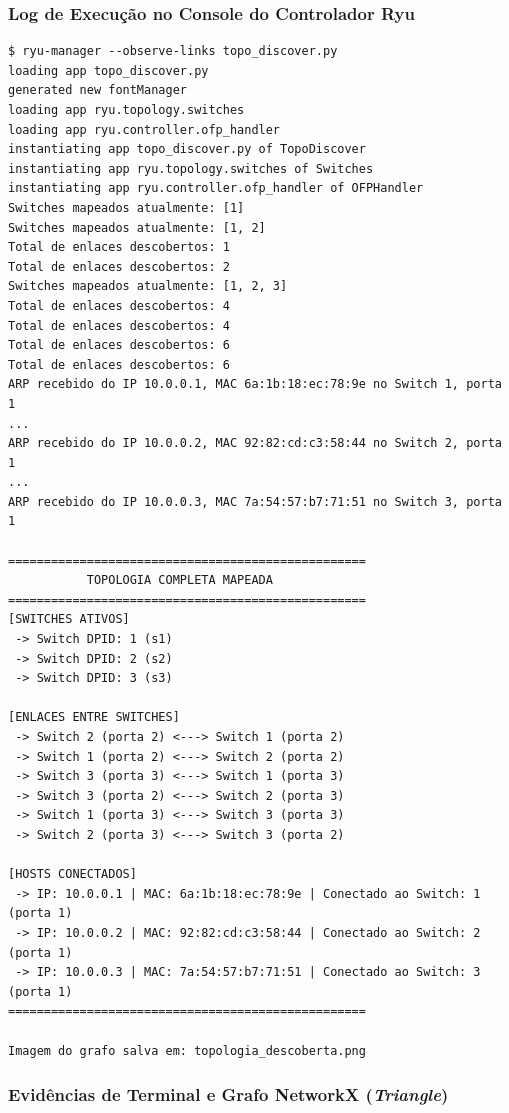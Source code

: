 \documentclass[12pt,a4paper]{article}
\begin{document}
\subsubsection{Log de Execução no Console do Controlador Ryu}
\begin{lstlisting}[caption={Saida completa do console do Ryu para a topologia Triangle}]
$ ryu-manager --observe-links topo_discover.py
loading app topo_discover.py
generated new fontManager
loading app ryu.topology.switches
loading app ryu.controller.ofp_handler
instantiating app topo_discover.py of TopoDiscover
instantiating app ryu.topology.switches of Switches
instantiating app ryu.controller.ofp_handler of OFPHandler
Switches mapeados atualmente: [1]
Switches mapeados atualmente: [1, 2]
Total de enlaces descobertos: 1
Total de enlaces descobertos: 2
Switches mapeados atualmente: [1, 2, 3]
Total de enlaces descobertos: 4
Total de enlaces descobertos: 4
Total de enlaces descobertos: 6
Total de enlaces descobertos: 6
ARP recebido do IP 10.0.0.1, MAC 6a:1b:18:ec:78:9e no Switch 1, porta 1
...
ARP recebido do IP 10.0.0.2, MAC 92:82:cd:c3:58:44 no Switch 2, porta 1
...
ARP recebido do IP 10.0.0.3, MAC 7a:54:57:b7:71:51 no Switch 3, porta 1

==================================================
           TOPOLOGIA COMPLETA MAPEADA            
==================================================
[SWITCHES ATIVOS]
 -> Switch DPID: 1 (s1)
 -> Switch DPID: 2 (s2)
 -> Switch DPID: 3 (s3)

[ENLACES ENTRE SWITCHES]
 -> Switch 2 (porta 2) <---> Switch 1 (porta 2)
 -> Switch 1 (porta 2) <---> Switch 2 (porta 2)
 -> Switch 3 (porta 3) <---> Switch 1 (porta 3)
 -> Switch 3 (porta 2) <---> Switch 2 (porta 3)
 -> Switch 1 (porta 3) <---> Switch 3 (porta 3)
 -> Switch 2 (porta 3) <---> Switch 3 (porta 2)

[HOSTS CONECTADOS]
 -> IP: 10.0.0.1 | MAC: 6a:1b:18:ec:78:9e | Conectado ao Switch: 1 (porta 1)
 -> IP: 10.0.0.2 | MAC: 92:82:cd:c3:58:44 | Conectado ao Switch: 2 (porta 1)
 -> IP: 10.0.0.3 | MAC: 7a:54:57:b7:71:51 | Conectado ao Switch: 3 (porta 1)
==================================================

Imagem do grafo salva em: topologia_descoberta.png
\end{lstlisting}

\subsubsection{Evidências de Terminal e Grafo NetworkX (\textit{Triangle})}
\end{document}
